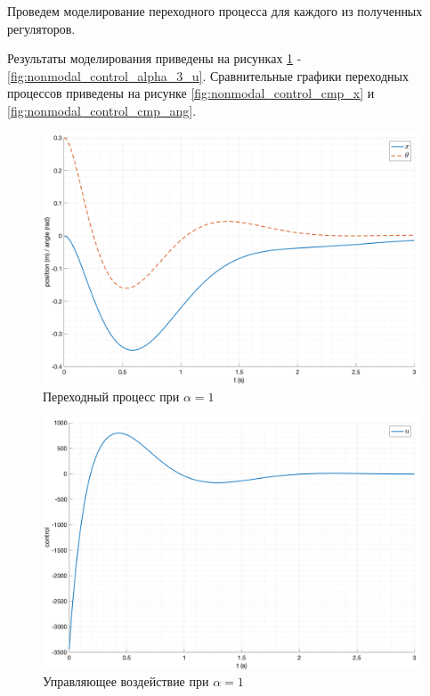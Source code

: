 Проведем моделирование переходного процесса для каждого из полученных регуляторов. 

Результаты моделирования приведены на рисунках \ref{fig:nonmodal_control_alpha_1} - \ref{fig:nonmodal_control_alpha_3_u}.
Сравнительные графики переходных процессов приведены на рисунке \ref{fig:nonmodal_control_cmp_x} и \ref{fig:nonmodal_control_cmp_ang}.

\begin{figure}[ht!]
    \centering
    \includegraphics[width=\textwidth]{media/plots/nonmodal_controllers/out_1.png}
    \caption{Переходный процесс при $\alpha = 1$}
    \label{fig:nonmodal_control_alpha_1}
\end{figure}
\begin{figure}[ht!]
    \centering
    \includegraphics[width=\textwidth]{media/plots/nonmodal_controllers/u_1.png}
    \caption{Управляющее воздействие при $\alpha = 1$}
    \label{fig:nonmodal_control_alpha_1_u}
\end{figure}
